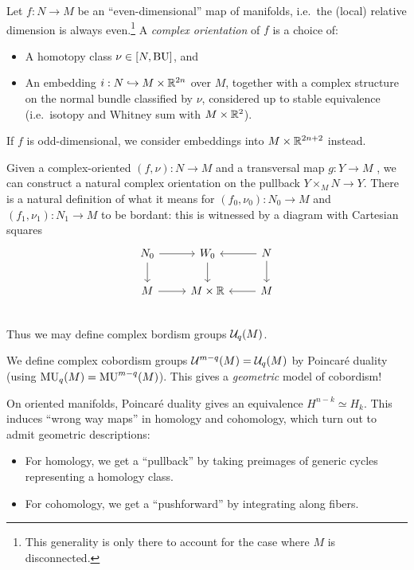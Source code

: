 \documentclass{article}
\begin{document}
\begin{dfn}
	Let $f: N \to M$ be an ``even-dimensional'' map of manifolds, i.e.\ the (local) relative dimension is always even.\footnote{This generality is only there to account for the case where $M$ is disconnected.}
	A \emph{complex orientation} of $f$ is a choice of:
	\begin{itemize}
		\item A homotopy class $\nu \in [N, \mathrm{BU}]$, and
		\item An embedding $i: N \hookrightarrow M \times \mathbb{R}^{2n}$ over $M$, together with a complex structure on the normal bundle classified by $\nu$, considered up to stable equivalence (i.e.\ isotopy and Whitney sum with $M \times \mathbb{R}^2$).
	\end{itemize}
\end{dfn}

If $f$ is odd-dimensional, we consider embeddings into $M \times \mathbb{R}^{2n+2}$ instead.

Given a complex-oriented $(f, \nu): N \to M$ and a transversal map $g: Y \to M$ , we can construct a natural complex orientation on the pullback $Y \times_M N \to Y$.
There is a natural definition of what it means for $(f_0, \nu_0): N_0 \to M$ and $(f_1, \nu_1): N_1 \to M$ to be bordant: this is witnessed by a diagram with Cartesian squares
\[
	\begin{tikzcd}
		N_0 \rar \dar & W_0 \dar & N \lar \dar \\
		M \rar & M \times \RR & M \lar \\
	\end{tikzcd}
\]
Thus we may define complex bordism groups $\mathcal{U}_q(M)$.

We define complex cobordism groups $\mathcal{U}^{m-q}(M) = \mathcal{U}_q(M)$ by Poincar\'e duality (using $\mathrm{MU}_q(M) = \mathrm{MU}^{m-q}(M)$).
This gives a \emph{geometric} model of cobordism!

On oriented manifolds, Poincar\'e duality gives an equivalence $H^{n-k} \simeq H_k$.
This induces ``wrong way maps'' in homology and cohomology, which turn out to admit geometric descriptions:
\begin{itemize}
	\item For homology, we get a ``pullback'' by taking preimages of generic cycles representing a homology class.
	\item For cohomology, we get a ``pushforward'' by integrating along fibers.
\end{itemize}
\end{document}
